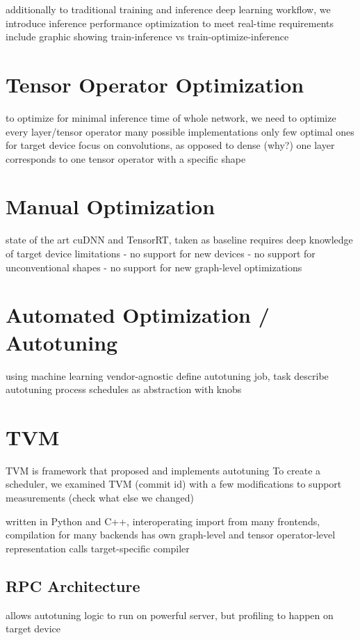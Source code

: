 additionally to traditional training and inference deep learning workflow, we introduce inference performance optimization to meet real-time requirements
include graphic showing train-inference vs train-optimize-inference

\section{Tensor Operator Optimization}
to optimize for minimal inference time of whole network, we need to optimize every layer/tensor operator
many possible implementations
only few optimal ones for target device
focus on convolutions, as opposed to dense (why?)
one layer corresponds to one tensor operator with a specific shape

\section{Manual Optimization}
state of the art cuDNN and TensorRT, taken as baseline
requires deep knowledge of target device
limitations
- no support for new devices
- no support for unconventional shapes
- no support for new graph-level optimizations

\section{Automated Optimization / Autotuning}
using machine learning
vendor-agnostic
define autotuning job, task
describe autotuning process
schedules as abstraction with knobs

\section{TVM}

TVM is framework that proposed and implements autotuning
To create a scheduler, we examined TVM (commit id) with a few modifications to support measurements (check what else we changed)

written in Python and C++, interoperating
import from many frontends, compilation for many backends
has own graph-level and tensor operator-level representation
calls target-specific compiler

\subsection{RPC Architecture}
allows autotuning logic to run on powerful server, but profiling to happen on target device

